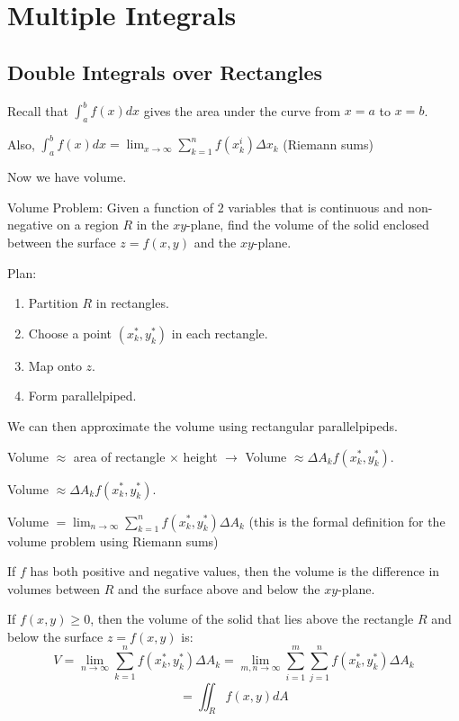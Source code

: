 \documentclass[../calc3.tex]{subfiles}
\begin{document}
\chapter{Multiple Integrals}
\section{Double Integrals over Rectangles}
Recall that $\int_a^b f(x)dx$ gives the area under the curve from $x=a$ to $x=b$.

Also, $\int_a^b f(x)dx=\lim_{x\to\infty}\sum_{k=1}^n f(x_k^i)\Delta x_k$ (Riemann sums)

Now we have volume.

Volume Problem: Given a function of $2$ variables that is continuous and non-negative on a region $R$ in the $xy$-plane, find the volume of the solid enclosed between the surface $z=f(x,y)$ and the $xy$-plane.

Plan:
\begin{enumerate}
    \item Partition $R$ in rectangles.
    \item Choose a point $(x_k^*, y_k^*)$ in each rectangle.
    \item Map onto $z$.
    \item Form parallelpiped.
\end{enumerate}

We can then approximate the volume using rectangular parallelpipeds.

Volume $\approx$ area of rectangle $\times$ height $\rightarrow$ Volume $\approx \Delta A_k f(x_k^*, y_k^*)$.

Volume $\approx \Delta A_k f(x_k^*, y_k^*)$.

Volume $=\lim_{n\to\infty}\sum_{k=1}^n f(x_k^*, y_k^*)\Delta A_k$ (this is the formal definition for the volume problem using Riemann sums)

If $f$ has both positive and negative values, then the volume is the difference in volumes between $R$ and the surface above and below the $xy$-plane.

\begin{definition}
    If $f(x,y)\geq 0$, then the volume of the solid that lies above the rectangle $R$ and below the surface $z=f(x,y)$ is:
    \[ V = \lim_{n\to\infty}\sum_{k=1}^{n}f(x_k^*, y_k^*)\Delta A_k = \lim_{m,n\to \infty}\sum_{i=1}^m\sum_{j=1}^nf(x_k^*,y_k^*)\Delta A_k \]
    \[ = \iint_R f(x,y)dA \]
\end{definition}
\end{document}
